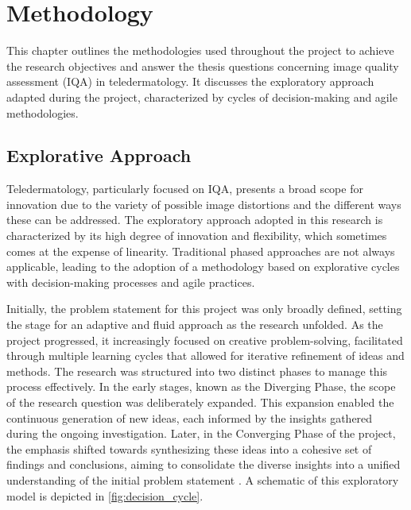 \chapter{Methodology}
\label{ch:Methodology}
This chapter outlines the methodologies used throughout the project to achieve the research objectives and answer the thesis questions concerning image quality assessment (IQA) in teledermatology. It discusses the exploratory approach adapted during the project, characterized by cycles of decision-making and agile methodologies.\par

\section{Explorative Approach}
\label{sec:ExplorativeApproach}
Teledermatology, particularly focused on IQA, presents a broad scope for innovation due to the variety of possible image distortions and the different ways these can be addressed. The exploratory approach adopted in this research is characterized by its high degree of innovation and flexibility, which sometimes comes at the expense of linearity. Traditional phased approaches are not always applicable, leading to the adoption of a methodology based on explorative cycles with decision-making processes and agile practices. \par
\vspace{\baselineskip}
\noindent
Initially, the problem statement for this project was only broadly defined, setting the stage for an adaptive and fluid approach as the research unfolded. As the project progressed, it increasingly focused on creative problem-solving, facilitated through multiple learning cycles that allowed for iterative refinement of ideas and methods. The research was structured into two distinct phases to manage this process effectively. In the early stages, known as the Diverging Phase, the scope of the research question was deliberately expanded. This expansion enabled the continuous generation of new ideas, each informed by the insights gathered during the ongoing investigation. Later, in the Converging Phase of the project, the emphasis shifted towards synthesizing these ideas into a cohesive set of findings and conclusions, aiming to consolidate the diverse insights into a unified understanding of the initial problem statement \autocite{DesignThinking}. A schematic of this exploratory model is depicted in  \autoref{fig:decision_cycle}.\par
